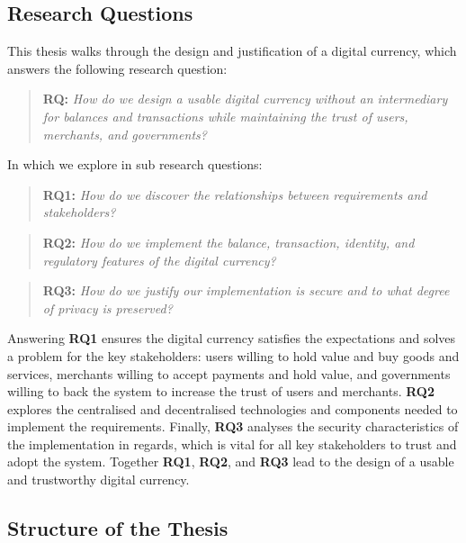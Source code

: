 \documentclass[12pt]{article} %
\begin{document}
\subsection{Research Questions}

This thesis walks through the design and justification of a digital currency, which answers the following research question:
\begin{quotation}
	\textbf{RQ: }\textit{How do we design a usable digital currency without an intermediary for balances and transactions while maintaining the trust of users, merchants, and governments?}
\end{quotation}

In which we explore in sub research questions:
\begin{quotation}
	\textbf{RQ1: }\textit{How do we discover the relationships between requirements and stakeholders?}
\end{quotation}

\begin{quotation}
	\textbf{RQ2: }\textit{How do we implement the balance, transaction, identity, and regulatory features of the digital currency?}
\end{quotation}

\begin{quotation}
	\textbf{RQ3: }\textit{How do we justify our implementation is secure and to what degree of privacy is preserved?}
\end{quotation}

Answering \textbf{RQ1} ensures the digital currency satisfies the expectations and solves a problem for the key stakeholders: users willing to hold value and buy goods and services, merchants willing to accept payments and hold value, and governments willing to back the system to increase the trust of users and merchants. \textbf{RQ2} explores the centralised and decentralised technologies and components needed to implement the requirements. Finally, \textbf{RQ3} analyses the security characteristics of the implementation in regards, which is vital for all key stakeholders to trust and adopt the system. Together \textbf{RQ1}, \textbf{RQ2}, and \textbf{RQ3} lead to the design of a usable and trustworthy digital currency.

\subsection{Structure of the Thesis}

\end{document}
